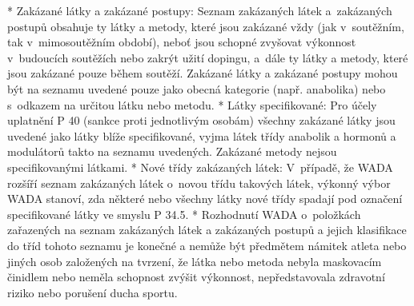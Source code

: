 * Zakázané látky a zakázané postupy: Seznam zakázaných látek a~zakázaných postupů obsahuje ty látky a metody, které jsou zakázané vždy (jak v~soutěžním, tak v~mimosoutěžním období), neboť jsou schopné zvyšovat výkonnost v~budoucích soutěžích nebo zakrýt užití dopingu, a~dále ty látky a metody, které jsou zakázané pouze během soutěží. Zakázané látky a zakázané postupy mohou být na seznamu uvedené pouze jako obecná kategorie (např. anabolika) nebo s~odkazem na určitou látku nebo metodu.
* Látky specifikované: Pro účely uplatnění P 40 (sankce proti jednotlivým osobám) všechny zakázané látky jsou uvedené jako látky blíže specifikované, vyjma látek třídy anabolik a hormonů a modulátorů takto na seznamu uvedených. Zakázané metody nejsou specifikovanými látkami.
* Nové třídy zakázaných látek: V~případě, že WADA rozšíří seznam zakázaných látek o~novou třídu takových látek, výkonný výbor WADA stanoví, zda některé nebo všechny látky nové třídy spadají pod označení specifikované látky ve smyslu P 34.5.
* Rozhodnutí WADA o~položkách zařazených na seznam zakázaných látek a zakázaných postupů a jejich klasifikace do tříd tohoto seznamu je konečné a nemůže být předmětem námitek atleta nebo jiných osob založených na tvrzení, že látka nebo metoda nebyla maskovacím činidlem nebo neměla schopnost zvýšit výkonnost, nepředstavovala zdravotní riziko nebo porušení ducha sportu.

